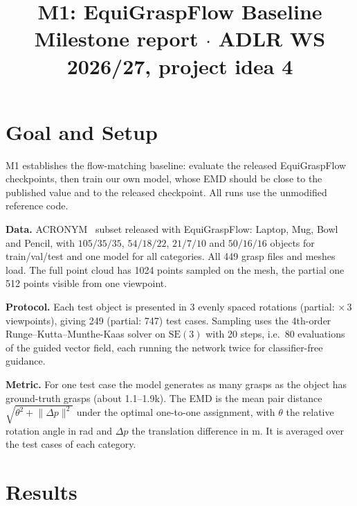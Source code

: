 \documentclass[conference]{IEEEtran}
\newcommand{\SE}{\mathrm{SE}(3)}
\begin{document}
\title{M1: EquiGraspFlow Baseline\\[0.3em]
  {\normalsize Milestone report $\cdot$ ADLR WS 2026/27, project idea 4}}

\author{
  \and
}

\maketitle

\section{Goal and Setup}

M1 establishes the flow-matching baseline: evaluate the released EquiGraspFlow~\cite{lim2024equigraspflow}
checkpoints, then train our own model, whose EMD should be close to the published value and to the
released checkpoint. All runs use the unmodified reference code.

\textbf{Data.} ACRONYM~\cite{eppner2021acronym} subset released with EquiGraspFlow: Laptop, Mug, Bowl and
Pencil, with $105/35/35$, $54/18/22$, $21/7/10$ and $50/16/16$ objects for train/val/test and one model
for all categories. All 449 grasp files and meshes load. The full point cloud has 1024 points sampled on the mesh, the partial one 512
points visible from one viewpoint.

\textbf{Protocol.} Each test object is presented in 3 evenly spaced rotations (partial: $\times\,3$
viewpoints), giving 249 (partial: 747) test cases. Sampling uses the 4th-order Runge--Kutta--Munthe-Kaas
solver on $\SE$ with 20 steps, i.e.\ 80 evaluations of the guided vector field, each running the network
twice for classifier-free guidance.

\textbf{Metric.} For one test case the model generates as many grasps as the object has ground-truth
grasps (about 1.1--1.9k). The EMD is the mean pair distance $\sqrt{\theta^2 + \lVert \Delta p \rVert^2}$
under the optimal one-to-one assignment, with $\theta$ the relative rotation angle in rad and $\Delta p$
the translation difference in m. It is averaged over the test cases of each category.

\section{Results}
\end{document}
